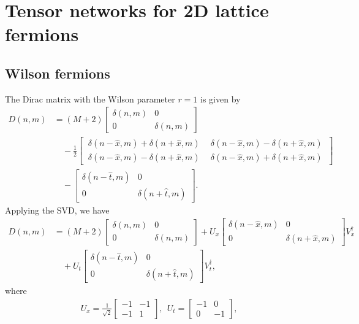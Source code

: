 
\section{Tensor networks for 2D lattice fermions}
\label{sec:2DTN}

\subsection{Wilson fermions}
\label{sec:wilson}

The Dirac matrix with the Wilson parameter $r=1$ is given by
\begin{align}
	D(n,m)&=(M+2)
\begin{bmatrix}
	\delta(n,m) & 0 \\
	0 & \delta(n,m)
\end{bmatrix}
\nonumber\\
&\quad-\frac{1}{2}
\begin{bmatrix}
	\ \delta(n-\hat{x},m)+\delta(n+\hat{x},m) \ & \ \delta(n-\hat{x},m)-\delta(n+\hat{x},m) \ \\
	\ \delta(n-\hat{x},m)-\delta(n+\hat{x},m) \ & \ \delta(n-\hat{x},m)+\delta(n+\hat{x},m) \
\end{bmatrix}
\nonumber\\
&\quad-
\begin{bmatrix}
	\delta(n-\hat{t},m) & 0 \\
	0 & \delta(n+\hat{t},m)
\end{bmatrix}
.
\end{align}
Applying the SVD, we have
\begin{align}
	D(n,m)&=(M+2)
\begin{bmatrix}
	\delta(n,m) & 0 \\
	0 & \delta(n,m)
\end{bmatrix}
+U_{x}
\begin{bmatrix}
	\delta(n-\hat{x},m) & 0 \\
	0 & \delta(n+\hat{x},m)
\end{bmatrix}
V_{x}^{\dagger}\nonumber\\
&\quad+U_{t}
\begin{bmatrix}
	\delta(n-\hat{t},m) & 0 \\
	0 & \delta(n+\hat{t},m)
\end{bmatrix}
V_{t}^{\dagger}
,
\end{align}
where
\begin{align}
	U_{x}=\frac{1}{\sqrt{2}}
\begin{bmatrix}
	-1 & -1 \\
	-1 & 1
\end{bmatrix}
,~~
	U_{t}=
\begin{bmatrix}
	-1 & 0 \\
	0 & -1
\end{bmatrix}
,
\end{align}
